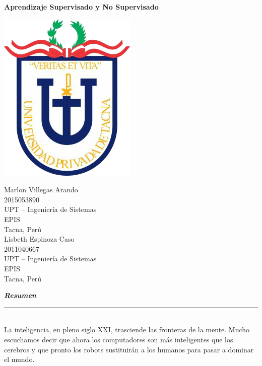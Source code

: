 \documentclass[11pt,a4paper]{article}
\begin{document}
		
		\begin{center}
			\huge \textbf{Aprendizaje Supervisado y No Supervisado} 
		\end{center}
		
		\begin{center}
			\includegraphics[scale=0.50]{./Imagenes/logo}
		\end{center}
		
		\begin{multicols}{2}
			\small
			\begin{center}
				Marlon Villegas Arando\\
				2015053890\\
				UPT – Ingeniería de Sistemas\\
				EPIS\\
				Tacna, Perú\\
				
				\vspace{\baselineskip}
				Lisbeth Espinoza Caso\\
				2011040667\\
				UPT – Ingeniería de Sistemas\\  
				EPIS\\	
				Tacna, Perú\\                 

			\end{center}
			\normalsize			
		\end{multicols}
		\vspace{\baselineskip}

		\textbf{\textit{\large Resumen}}\rule[1.5mm]{5mm}{0.1mm}	\vspace{\baselineskip}
		
		\\La inteligencia, en pleno siglo XXI, trasciende las fronteras de la mente. Mucho escuchamos decir que ahora los computadores son más inteligentes que los cerebros y que pronto los robots sustituirán a los humanos para pasar a dominar el mundo.\\
		
\end{document}
